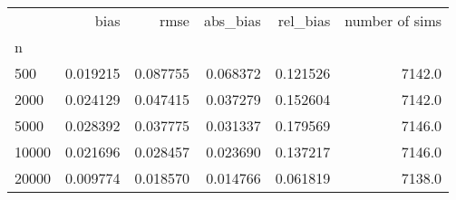 \begin{tabular}{lrrrrr}
\toprule
{} &      bias &      rmse &  abs_bias &  rel_bias &  number of sims \\
n     &           &           &           &           &                 \\
\midrule
500   &  0.019215 &  0.087755 &  0.068372 &  0.121526 &          7142.0 \\
2000  &  0.024129 &  0.047415 &  0.037279 &  0.152604 &          7142.0 \\
5000  &  0.028392 &  0.037775 &  0.031337 &  0.179569 &          7146.0 \\
10000 &  0.021696 &  0.028457 &  0.023690 &  0.137217 &          7146.0 \\
20000 &  0.009774 &  0.018570 &  0.014766 &  0.061819 &          7138.0 \\
\bottomrule
\end{tabular}
